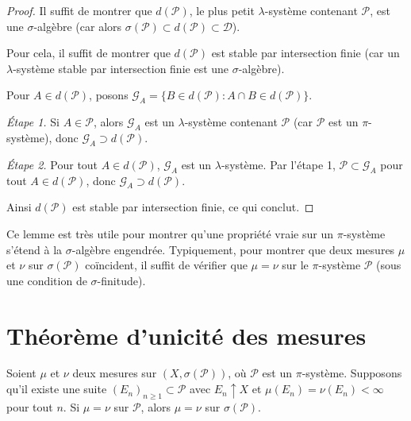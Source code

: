 \begin{proof}
Il suffit de montrer que $d(\mathcal{P})$, le plus petit $\lambda$-syst\`eme
contenant $\mathcal{P}$, est une $\sigma$-alg\`ebre (car alors
$\sigma(\mathcal{P}) \subset d(\mathcal{P}) \subset \mathcal{D}$).

Pour cela, il suffit de montrer que $d(\mathcal{P})$ est stable par intersection
finie (car un $\lambda$-syst\`eme stable par intersection finie est une
$\sigma$-alg\`ebre).

Pour $A \in d(\mathcal{P})$, posons
$\mathcal{G}_A = \{B \in d(\mathcal{P}) : A \cap B \in d(\mathcal{P})\}$.

\emph{\'Etape 1.} Si $A \in \mathcal{P}$, alors $\mathcal{G}_A$ est un
$\lambda$-syst\`eme contenant $\mathcal{P}$ (car $\mathcal{P}$ est un
$\pi$-syst\`eme), donc $\mathcal{G}_A \supset d(\mathcal{P})$.

\emph{\'Etape 2.} Pour tout $A \in d(\mathcal{P})$, $\mathcal{G}_A$ est un
$\lambda$-syst\`eme. Par l'\'etape 1, $\mathcal{P} \subset \mathcal{G}_A$ pour
tout $A \in d(\mathcal{P})$, donc $\mathcal{G}_A \supset d(\mathcal{P})$.

Ainsi $d(\mathcal{P})$ est stable par intersection finie, ce qui conclut.
\end{proof}

\begin{attention}[title=\textbf{Utilisation du lemme $\pi$-$\lambda$}]
Ce lemme est tr\`es utile pour montrer qu'une propri\'et\'e vraie sur un
$\pi$-syst\`eme s'\'etend \`a la $\sigma$-alg\`ebre engendr\'ee. Typiquement, pour
montrer que deux mesures $\mu$ et $\nu$ sur $\sigma(\mathcal{P})$ co\"incident, il
suffit de v\'erifier que $\mu = \nu$ sur le $\pi$-syst\`eme $\mathcal{P}$ (sous une
condition de $\sigma$-finitude).
\end{attention}

\section{Th\'eor\`eme d'unicit\'e des mesures}

\begin{theoreme}
\label{thm:unicite_mesures}
Soient $\mu$ et $\nu$ deux mesures sur $(X, \sigma(\mathcal{P}))$, o\`u
$\mathcal{P}$ est un $\pi$-syst\`eme. Supposons qu'il existe une suite
$(E_n)_{n \geq 1} \subset \mathcal{P}$ avec $E_n \uparrow X$ et
$\mu(E_n) = \nu(E_n) < \infty$ pour tout $n$. Si $\mu = \nu$ sur $\mathcal{P}$,
alors $\mu = \nu$ sur $\sigma(\mathcal{P})$.
\end{theoreme}

